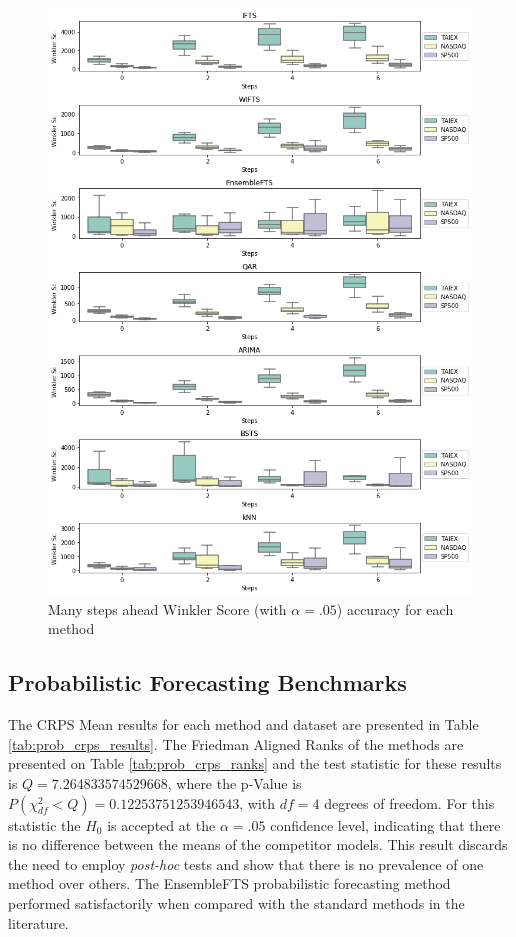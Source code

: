 \begin{figure}[htb]
    \centering
    \includegraphics[width=\textwidth]{figures/interval_many_steps.png}
    \caption{Many steps ahead Winkler Score (with $\alpha=.05$) accuracy for each method}
    \label{fig:interval_many_steps}
\end{figure}

%
\subsection{Probabilistic Forecasting Benchmarks}
\label{sec:prob_experiments_probabilistic}

The CRPS Mean results for each method and dataset are presented in Table \ref{tab:prob_crps_results}. The Friedman Aligned Ranks of the methods are presented on Table \ref{tab:prob_crps_ranks} and the test statistic for these results is $Q = 7.264833574529668$, where the p-Value is $P(\chi ^2_{df} < Q) = 0.12253751253946543$, with $df=4$ degrees of freedom. For this statistic the $H_0$ is accepted at the $\alpha = .05$ confidence level, indicating that there is no difference between the means of the competitor models. This result discards the need to employ \textit{post-hoc} tests and show that there is no prevalence of one method over others. The EnsembleFTS probabilistic forecasting method performed satisfactorily when compared with the standard methods in the literature. 


